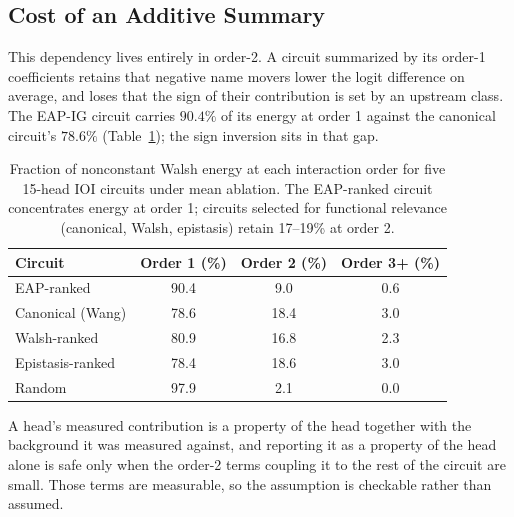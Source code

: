 \documentclass{article}
\begin{document}
\subsection{Cost of an Additive Summary}

This dependency lives entirely in order-2. A circuit summarized by its order-1 coefficients
retains that negative name movers lower the logit difference on average, and loses that the
sign of their contribution is set by an upstream class. The EAP-IG circuit
carries $90.4\%$ of its energy at order 1 against the canonical circuit's $78.6\%$
(Table~\ref{tab:energy}); the sign inversion sits in that gap.

\begin{table}[h]
\centering
\begin{tabular}{lccc}
\toprule
Circuit & Order 1 (\%) & Order 2 (\%) & Order 3{+} (\%) \\
\midrule
EAP-ranked           & 90.4 & 9.0  & 0.6 \\
Canonical (Wang)     & 78.6 & 18.4 & 3.0 \\
Walsh-ranked         & 80.9 & 16.8 & 2.3 \\
Epistasis-ranked     & 78.4 & 18.6 & 3.0 \\
Random               & 97.9 & 2.1  & 0.0 \\
\bottomrule
\end{tabular}
\caption{Fraction of nonconstant Walsh energy at each interaction order
for five 15-head IOI circuits under mean ablation. The EAP-ranked circuit
concentrates energy at order 1; circuits selected for functional relevance
(canonical, Walsh, epistasis) retain 17--19\% at order 2.}
\label{tab:energy}
\end{table}

A head's measured contribution is a
property of the head together with the background it was measured against, and reporting it
as a property of the head alone is safe only when the order-2 terms coupling it to the rest
of the circuit are small. Those terms are measurable, so the assumption is checkable rather
than assumed.
\end{document}
